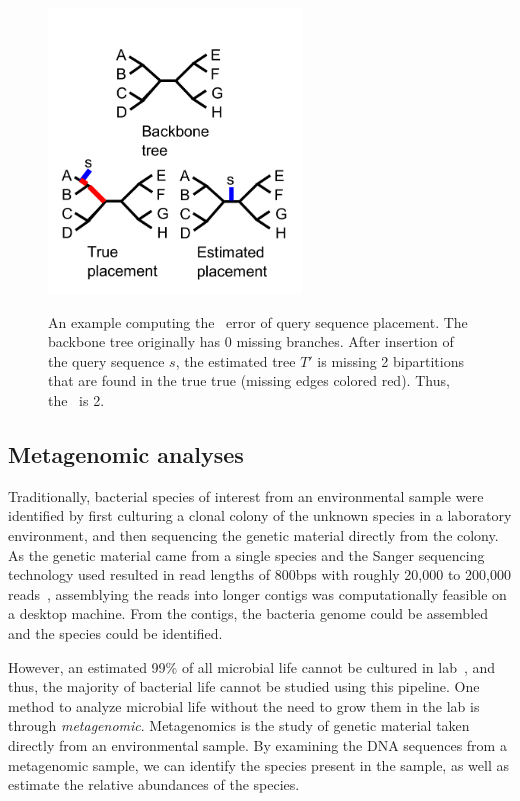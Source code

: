 
\begin{figure}[htbp]
\centering
{\includegraphics[width=0.60\textwidth]{background/unrooted_phylogeny_b}}
\caption[Computing \deltafn~error of query sequence placement.]{\label{back:placement_error}An example computing the \deltafn~error of query sequence placement.  The backbone tree originally has 0 missing branches.  After insertion of the query sequence $s$, the estimated tree $T'$ is missing 2 bipartitions that are found in the true true (missing edges colored red).  Thus, the \deltafn~is 2.}
\end{figure}

\subsection{Metagenomic analyses}\label{back:metagenomic}
Traditionally, bacterial species of interest from an environmental sample were identified by first culturing a clonal colony of the unknown species in a laboratory environment, and then sequencing the genetic material directly from the colony.  As the genetic material came from a single species and the Sanger sequencing technology used resulted in read lengths of 800bps with roughly 20,000 to 200,000 reads~\cite{todo}, assemblying the reads into longer contigs was computationally feasible on a desktop machine.  From the contigs, the bacteria genome could be assembled and the species could be identified.

However, an estimated 99\% of all microbial life cannot be cultured in lab~\cite{todo}, and thus, the majority of bacterial life cannot be studied using this pipeline.  One method to analyze microbial life without the need to grow them in the lab is through \emph{metagenomic}.  Metagenomics is the study of genetic material taken directly from an environmental sample.  By examining the DNA sequences from a metagenomic sample, we can identify the species present in the sample, as well as estimate the relative abundances of the species.

